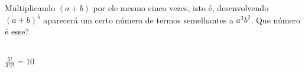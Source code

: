 \begin{ex}
Multiplicando $(a+b)$ por ele mesmo cinco vezes, isto é, desenvolvendo $(a+b)^5$ aparecerá um certo número de termos semelhantes a $a^3 b^2$. Que número é esse?
  \begin{sol}
    \phantom{A} \\
    $\frac{5!}{3!2!}=10$
  \end{sol}
\end{ex}